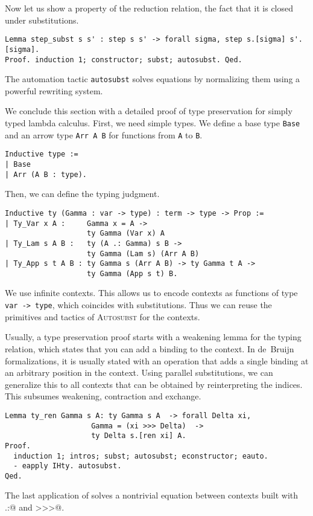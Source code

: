 \documentclass{scrartcl}
\newcommand{\Autosubst}{\textsc{Autosubst}\xspace}
\newcommand{\lst}{\lstinline}
\begin{document}
Now let us show a property of the reduction relation, the fact that it is closed under substitutions.
\begin{lstlisting}
Lemma step_subst s s' : step s s' -> forall sigma, step s.[sigma] s'.[sigma].
Proof. induction 1; constructor; subst; autosubst. Qed.
\end{lstlisting}
The automation tactic \lst$autosubst$ solves equations by normalizing them using a powerful rewriting system. 

We conclude this section with a detailed proof of type preservation for simply typed lambda calculus.
First, we need simple types. We define a base type \lst$Base$ and an arrow type \lst$Arr A B$ for functions from \lst$A$ to \lst$B$.
\begin{lstlisting}
Inductive type :=
| Base
| Arr (A B : type).
\end{lstlisting}
Then, we can define the typing judgment.
\begin{lstlisting}
Inductive ty (Gamma : var -> type) : term -> type -> Prop :=
| Ty_Var x A :     Gamma x = A -> 
                   ty Gamma (Var x) A
| Ty_Lam s A B :   ty (A .: Gamma) s B -> 
                   ty Gamma (Lam s) (Arr A B)
| Ty_App s t A B : ty Gamma s (Arr A B) -> ty Gamma t A -> 
                   ty Gamma (App s t) B.
\end{lstlisting}
We use infinite contexts. This allows us to encode contexts as functions of type \lst$var -> type$, which coincides with substitutions. Thus we can reuse the primitives and tactics of \Autosubst for the contexts.

Usually, a type preservation proof starts with a weakening lemma for the typing relation, which states that you can add a binding to the context. 
In de~Bruijn formalizations, it is usually stated with an operation that adds a single binding at an arbitrary position in the context.
Using parallel substitutions, we can generalize this to all contexts that can be obtained by reinterpreting the indices. This subsumes weakening, contraction and exchange.
\begin{lstlisting}
Lemma ty_ren Gamma s A: ty Gamma s A  -> forall Delta xi, 
                    Gamma = (xi >>> Delta)  ->
                    ty Delta s.[ren xi] A.
Proof.
  induction 1; intros; subst; autosubst; econstructor; eauto. 
  - eapply IHty. autosubst.
Qed.
\end{lstlisting}
The last application of \lst@autosubst@ solves a nontrivial equation between contexts built with \lst@.:@ and \lst@>>>@.
\end{document}
